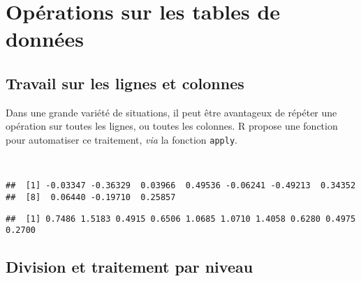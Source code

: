 \chapter{Opérations sur les tables de données\label{c:tables}}

\section{Travail sur les lignes et colonnes}

Dans une grande variété de situations, il peut être avantageux de répéter une opération sur toutes les lignes, ou toutes les colonnes.
R propose une fonction pour automatiser ce traitement, \emph{via} la fonction \texttt{apply}. 

\begin{knitrout}
\color{fgcolor}\begin{kframe}
\begin{flushleft}
\ttfamily\noindent
{}\hlassignement{\usebox{\hlnormalsizeboxlessthan}-}{\ }\hlkeyword{(}\hlkeyword{(}\hlkeyword{)}\hlkeyword{,}{\ }\hlargument{=}{\ }\hlkeyword{)}\hspace*{\fill}\\
\hlstd{}\hlkeyword{(}\hlkeyword{,}{\ }\hlkeyword{,}{\ }\hlkeyword{)}\mbox{}
\normalfont
\end{flushleft}
\begin{verbatim}
##  [1] -0.03347 -0.36329  0.03966  0.49536 -0.06241 -0.49213  0.34352
##  [8]  0.06440 -0.19710  0.25857
\end{verbatim}
\begin{flushleft}
\ttfamily\noindent
{}\hlkeyword{(}\hlkeyword{,}{\ }\hlkeyword{,}{\ }\hlkeyword{)}\mbox{}
\normalfont
\end{flushleft}
\begin{verbatim}
##  [1] 0.7486 1.5183 0.4915 0.6506 1.0685 1.0710 1.4058 0.6280 0.4975 0.2700
\end{verbatim}
\end{kframe}
\end{knitrout}


\section{Division et traitement par niveau}

